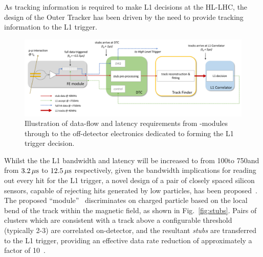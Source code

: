As tracking information is required to make L1 decisions at the HL-LHC, the design of the Outer Tracker has been driven by the need to provide tracking information to the L1 trigger.


\begin{figure}[tb]
\centering
\includegraphics[width=\textwidth]{figs/tk-upgrade/dataflow.pdf}
\caption{Illustration of data-flow and latency requirements from \pt-modules through to the off-detector electronics dedicated to forming the L1 trigger decision.}
\label{fig:dataFlow}
\end{figure}
Whilst the the L1 bandwidth and latency will be increased to from 100\kHz to 750\kHz and from $3.2\,\mu\text{s}$ to $12.5\,\mu\text{s}$ respectively, given the bandwidth implications for reading out every hit for the L1 trigger, a novel design of a pair of closely spaced silicon sensors, capable of rejecting hits generated by low \pT particles, has been proposed~\cite{jjonespixel,markthesis}.
The proposed ``\pT module''~\cite{jjonespixel,markthesis} discriminates on charged particle \pT based on the local bend of the track within the magnetic field, as shown in Fig.~\ref{fig:stubs}.
Pairs of clusters which are consistent with a track \pT above a configurable threshold (typically 2-3\GeV) are correlated on-detector, and the resultant \emph{stubs} are transferred to the L1 trigger, providing an effective data rate reduction of approximately a factor of 10~\cite{mpessimperf,2dptmoduleconcept}.

